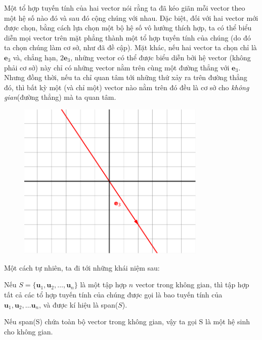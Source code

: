 Một tổ hợp tuyến tính của hai vector nói rằng ta đã kéo giãn mỗi vector theo một hệ số nào đó và sau đó cộng chúng với nhau. Đặc biệt, đối với hai vector mới được chọn, bằng cách lựa chọn một bộ hệ số vô hướng thích hợp, ta có thể biểu diễn mọi vector trên mặt phẳng thành một tổ hợp tuyến tính của chúng (do đó ta chọn chúng làm cơ sở, như đã đề cập). 
Mặt khác, nếu hai vector ta chọn chỉ là \(\mathbf{e}_3\) và, chẳng hạn, \(2\mathbf{e}_3\), những vector có thể được biểu diễn bởi hệ vector (không phải cơ sở) này chỉ có những vector nằm trên cùng một đường thẳng với \(\mathbf{e}_3\). Nhưng đồng thời, nếu ta chỉ quan tâm tới 
những thứ xảy ra trên đường thẳng đó, thì bất kỳ một (và chỉ một) vector nào nằm trên đó đều là cơ sở cho \emph{không gian}(đường thẳng) mà ta quan tâm.
\begin{figure}[H]
    \centering
    \includegraphics[width=0.8\textwidth]{Tuan2/Figures/avectoronaline.png}
\end{figure}

\vspace{8pt}

Một cách tự nhiên, ta đi tới những khái niệm sau:
\begin{definition}
    Nếu \(S=\{\mathbf{u}_{1}, \mathbf{u}_{2},\dots,  \mathbf{u}_{n}\}\) là một tập hợp \(n\) vector trong không gian, thì tập hợp tất cả các tổ hợp tuyến tính của chúng được gọi là bao tuyến tính của \(\mathbf{u}_{1}, \mathbf{u}_{2},\dots \mathbf{u}_{n}\), và được kí hiệu là span(\(S\)).
    \vspace{8pt}

    Nếu span(S) chứa toàn bộ vector trong không gian, vậy ta gọi S là một hệ sinh cho không gian.
\end{definition}

